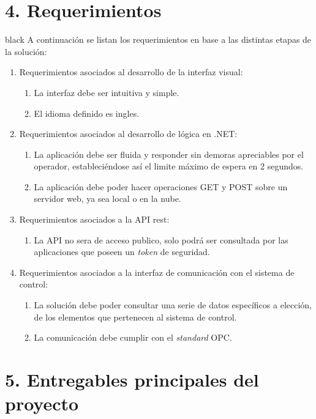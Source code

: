 \documentclass[11pt]{charter}
\begin{document}
\section{4. Requerimientos}
\label{sec:requerimientos}

\begin{consigna}{black}
A continuación se listan los requerimientos en base a las distintas etapas de la solución:

\begin{enumerate}
\item Requerimientos asociados al desarrollo de la interfaz visual:
	\begin{enumerate}
	\item La interfaz debe ser intuitiva y simple.
	\item El idioma definido es ingles.
	\end{enumerate}
\item Requerimientos asociados al desarrollo de lógica en .NET:
	\begin{enumerate}
	\item La aplicación debe ser fluida y responder sin demoras apreciables por el operador, estableciéndose así el limite máximo de espera en 2 segundos.
	\item La aplicación debe poder hacer operaciones GET y POST sobre un servidor web, ya sea local o en la nube.
	\end{enumerate}
\item Requerimientos asociados a la API rest:
	\begin{enumerate}
	\item La API no sera de acceso publico, solo podrá ser consultada por las aplicaciones que poseen un \textit{token} de seguridad.
	\end{enumerate}
\item Requerimientos asociados a la interfaz de comunicación con el sistema de control:	
	\begin{enumerate}	
	\item La solución debe poder consultar una serie de datos específicos a elección, de los elementos que pertenecen al sistema de control.
	\item La comunicación debe cumplir con el \textit{standard} OPC.
	\end{enumerate}
\end{enumerate}

\end{consigna}

\section{5. Entregables principales del proyecto}
\label{sec:entregables}
\end{document}
